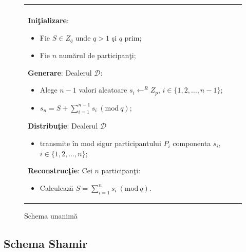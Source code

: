 \documentclass{llncs}
\newcommand{\Mod}[1]{\ (\text{mod}\ #1)}
\begin{document}
\begin{figure}[h!]

\begin{tabular}{|p{\textwidth}|}
\hline

\\
\hspace{.1in}
\textbf{Ini\c{t}ializare}: 
	\begin{itemize}
		\item Fie $S \in Z_q$ unde $q > 1 $ \c{s}i $q$ prim;
		\item Fie $n$ num\u{a}rul de participan\c{t}i;
	\end{itemize}
\medskip

\hspace{.1in}
\textbf{Generare}: Dealerul $\mathcal{D}$:
	\begin{itemize}
		\setlength{\itemsep}{5pt}
		\item Alege $n - 1$ valori aleatoare $s_i \leftarrow^R Z_p$, $i \in \{1,2,\dots,{n-1}\}$;
		\item $s_n = S + \sum\limits_{i=1}^{n-1} s_i \Mod q $;
	\end{itemize}
\medskip

\hspace{.1in}
\textbf{Distribu\c{t}ie}: Dealerul $\mathcal{D}$
	\begin{itemize}
		\item transmite \^{i}n mod sigur participantului $P_i$ componenta $s_i$, $i \in \{1,2,\dots,n\}$;
	\end{itemize}

\hspace{.1in}
\textbf{Reconstruc\c{t}ie}: Cei $n$ participan\c{t}i:
	\begin{itemize}
		\item Calculeaz\u{a} $S = \sum\limits_{i=1}^{n} s_i \Mod q$.
	\end{itemize}

\\
\hline
\end{tabular}
\caption{Schema unanim\u{a} \cite{Karnin:83}}
\label{fig:all_or_nothing}
\end{figure}




\subsection{Schema Shamir}
\end{document}
